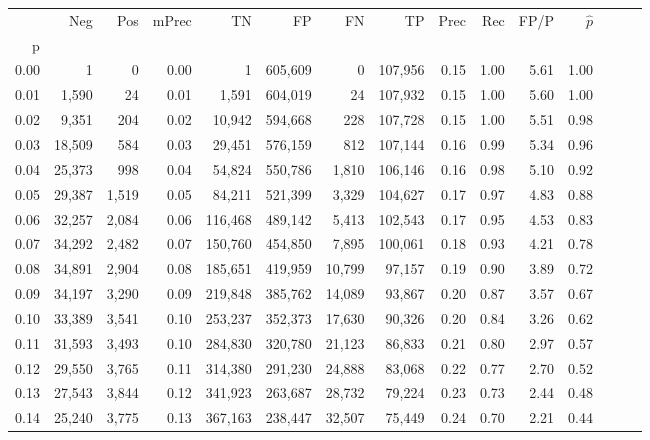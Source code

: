 \begin{tabular}{rrrrrrrrrrrrrrr}
\toprule
{} &     Neg &    Pos & mPrec &       TN &       FP &       FN &       TP &  Prec &   Rec &  FP/P & $\hat{p}$ \\
p    &         &        &       &          &          &          &          &       &       &       &           \\
\midrule
0.00 &       1 &      0 &  0.00 &        1 &  605,609 &        0 &  107,956 &  0.15 &  1.00 &  5.61 &      1.00 \\
0.01 &   1,590 &     24 &  0.01 &    1,591 &  604,019 &       24 &  107,932 &  0.15 &  1.00 &  5.60 &      1.00 \\
0.02 &   9,351 &    204 &  0.02 &   10,942 &  594,668 &      228 &  107,728 &  0.15 &  1.00 &  5.51 &      0.98 \\
0.03 &  18,509 &    584 &  0.03 &   29,451 &  576,159 &      812 &  107,144 &  0.16 &  0.99 &  5.34 &      0.96 \\
0.04 &  25,373 &    998 &  0.04 &   54,824 &  550,786 &    1,810 &  106,146 &  0.16 &  0.98 &  5.10 &      0.92 \\
0.05 &  29,387 &  1,519 &  0.05 &   84,211 &  521,399 &    3,329 &  104,627 &  0.17 &  0.97 &  4.83 &      0.88 \\
0.06 &  32,257 &  2,084 &  0.06 &  116,468 &  489,142 &    5,413 &  102,543 &  0.17 &  0.95 &  4.53 &      0.83 \\
0.07 &  34,292 &  2,482 &  0.07 &  150,760 &  454,850 &    7,895 &  100,061 &  0.18 &  0.93 &  4.21 &      0.78 \\
0.08 &  34,891 &  2,904 &  0.08 &  185,651 &  419,959 &   10,799 &   97,157 &  0.19 &  0.90 &  3.89 &      0.72 \\
0.09 &  34,197 &  3,290 &  0.09 &  219,848 &  385,762 &   14,089 &   93,867 &  0.20 &  0.87 &  3.57 &      0.67 \\
0.10 &  33,389 &  3,541 &  0.10 &  253,237 &  352,373 &   17,630 &   90,326 &  0.20 &  0.84 &  3.26 &      0.62 \\
0.11 &  31,593 &  3,493 &  0.10 &  284,830 &  320,780 &   21,123 &   86,833 &  0.21 &  0.80 &  2.97 &      0.57 \\
0.12 &  29,550 &  3,765 &  0.11 &  314,380 &  291,230 &   24,888 &   83,068 &  0.22 &  0.77 &  2.70 &      0.52 \\
0.13 &  27,543 &  3,844 &  0.12 &  341,923 &  263,687 &   28,732 &   79,224 &  0.23 &  0.73 &  2.44 &      0.48 \\
0.14 &  25,240 &  3,775 &  0.13 &  367,163 &  238,447 &   32,507 &   75,449 &  0.24 &  0.70 &  2.21 &      0.44 \\

\end{tabular}
